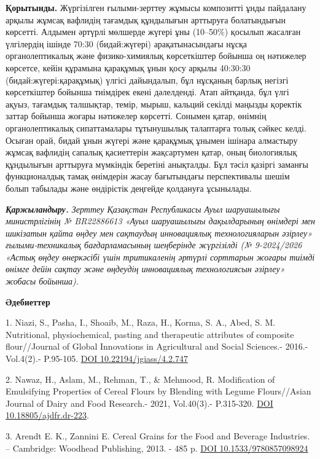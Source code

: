 {\bfseries Қорытынды.} Жүргізілген ғылыми-зерттеу жұмысы композитті ұнды
пайдалану арқылы жұмсақ вафлидің тағамдық құндылығын арттыруға
болатындығын көрсетті. Алдымен әртүрлі мөлшерде жүгері ұны (10--50\%)
қосылып жасалған үлгілердің ішінде 70:30 (бидай:жүгері) арақатынасындағы
нұсқа органолептикалық және физико-химиялық көрсеткіштер бойынша оң
нәтижелер көрсетсе, кейін құрамына қарақұмық ұнын қосу арқылы 40:30:30
(бидай:жүгері:қарақұмық) үлгісі дайындалып, бұл нұсқаның барлық негізгі
көрсеткіштер бойынша тиімдірек екені дәлелденді. Атап айтқанда, бұл үлгі
ақуыз, тағамдық талшықтар, темір, мырыш, кальций секілді маңызды
қоректік заттар бойынша жоғары нәтижелер көрсетті. Сонымен қатар,
өнімнің органолептикалық сипаттамалары тұтынушылық талаптарға толық
сәйкес келді. Осыған орай, бидай ұнын жүгері және қарақұмық ұнымен
ішінара алмастыру жұмсақ вафлидің сапалық қасиеттерін жақсартумен қатар,
оның биологиялық құндылығын арттыруға мүмкіндік беретіні анықталды. Бұл
тәсіл қазіргі заманғы функционалдық тамақ өнімдерін жасау бағытындағы
перспективалы шешім болып табылады және өндірістік деңгейде қолдануға
ұсынылады.

\emph{{\bfseries Қаржыландыру.} Зерттеу Қазақстан Республикасы Ауыл
шаруашылығы министрлігінің № BR22886613 «Ауыл шаруашылығы дақылдарының
өнімдері мен шикізатын қайта өңдеу мен сақтаудың инновациялық
технологияларын әзірлеу» ғылыми-техникалық бағдарламасының шеңберінде
жүргізілді (№ 9-2024/2026 «Астық өңдеу өнеркәсібі үшін тритикаленің
әртүрлі сорттарын жоғары тиімді өнімге дейін сақтау және өңдеудің
инновациялық технологиясын әзірлеу» жобасы бойынша).}

{\bfseries Әдебиеттер}

1. Niazi, S., Pasha, I., Shoaib, M., Raza, H., Korma, S. A., Abed, S. M.
Nutritional, physiochemical, pasting and therapeutic attributes of
composite flour//Journal of Global Innovations in Agricultural and
Social Sciences.- 2016.-Vol.4(2).- P.95-105.
\href{https://doi.org/10.22194/jgiass/4.2.747}{DOI
10.22194/jgiass/4.2.747}

2. Nawaz, H., Aslam, M., Rehman, T., \& Mehmood, R. Modification of
Emulsifying Properties of Cereal Flours by Blending with Legume
Flours//Asian Journal of Dairy and Food Research.- 2021, Vol.40(3).-
P.315-320. \href{https://doi.org/10.18805/ajdfr.dr-223}{DOI
10.18805/ajdfr.dr-223}.

3. Arendt E. K., Zannini E. Cereal Grains for the Food and Beverage
Industries. -- Cambridge: Woodhead Publishing, 2013. - 485 p.
\href{https://doi.org/10.1533/9780857098924}{DOI 10.1533/9780857098924}

